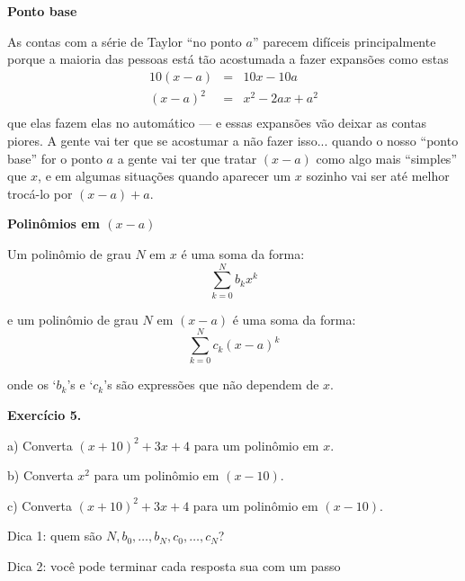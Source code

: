 \documentclass[oneside,12pt]{article}
\begin{document}
\newpage


{\bf Ponto base}

As contas com a série de Taylor ``no ponto $a$'' parecem difíceis
principalmente porque a maioria das pessoas está tão acostumada a
fazer expansões como estas
%
$$\begin{array}{rcl}
  10(x-a) &=& 10x - 10a \\
  (x-a)^2 &=& x^2 - 2ax + a^2 \\
  \end{array}
$$
%
que elas fazem elas no automático --- e essas expansões vão deixar as
contas  piores. A gente vai ter que se acostumar a
não fazer isso... quando o nosso ``ponto base'' for o ponto $a$ a
gente vai ter que tratar $(x-a)$ como algo mais ``simples'' que $x$, e
em algumas situações quando aparecer um $x$ sozinho vai ser até melhor
trocá-lo por $(x-a)+a$.

\newpage


{\bf Polinômios em $(x-a)$}

\ssk

Um polinômio de grau $N$ em $x$ é uma soma da forma:
%
$$\sum_{k=0}^{N} b_k x^k$$

e um polinômio de grau $N$ em $(x-a)$ é uma soma da forma:
%
$$\sum_{k=0}^{N} c_k (x-a)^k$$

onde os `$b_k$'s e `$c_k$'s são expressões que não dependem de $x$.

\msk

\newpage


{\bf Exercício 5.}

a) Converta $(x+10)^2 + 3x + 4$ para um polinômio em $x$. 

b) Converta $x^2$ para um polinômio em $(x-10)$.

c) Converta $(x+10)^2 + 3x + 4$ para um polinômio em $(x-10)$.

\bsk

Dica 1: quem são $N, b_0, \ldots, b_N, c_0, \ldots, c_N$?

Dica 2: você pode terminar cada resposta sua com um passo
\end{document}
